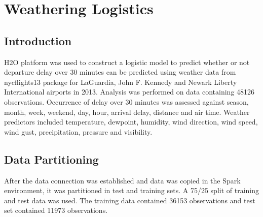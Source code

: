 \documentclass[12pt,twoside]{amherstthesis}
\begin{document}
  \chapter{Weathering Logistics}\label{weathering-logistics}
  
  \section{Introduction}\label{introduction-3}
  
  H2O platform was used to construct a logistic model to predict whether
  or not departure delay over 30 minutes can be predicted using weather
  data from nycflights13 package for LaGuardia, John F. Kennedy and Newark
  Liberty International airports in 2013. Analysis was performed on data
  containing 48126 observations. Occurrence of delay over 30 minutes was
  assessed against season, month, week, weekend, day, hour, arrival delay,
  distance and air time. Weather predictors included temperature,
  dewpoint, humidity, wind direction, wind speed, wind gust,
  precipitation, pressure and visibility.
  
  \section{Data Partitioning}\label{data-partitioning-1}
  
  After the data connection was established and data was copied in the
  Spark environment, it was partitioned in test and training sets. A 75/25
  split of training and test data was used. The training data contained
  36153 observations and test set contained 11973 observations.
  
  \begin{Shaded}
  \end{Shaded}
  
\end{document}
